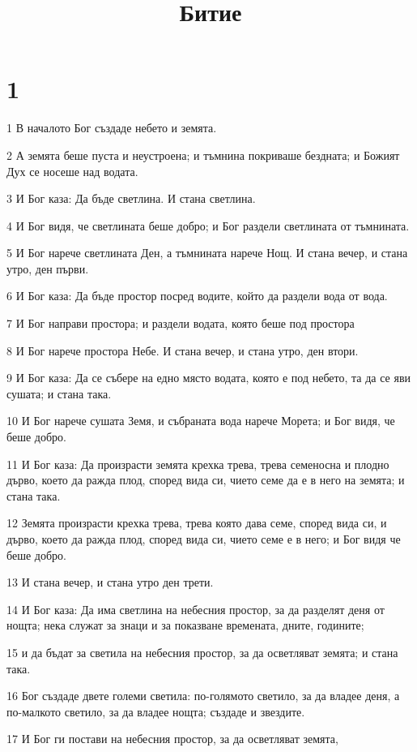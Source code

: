 

\title{Битие}


\chapter{1}

\par 1 В началото Бог създаде небето и земята.
\par 2 А земята беше пуста и неустроена; и тъмнина покриваше бездната; и Божият Дух се носеше над водата.
\par 3 И Бог каза: Да бъде светлина. И стана светлина.
\par 4 И Бог видя, че светлината беше добро; и Бог раздели светлината от тъмнината.
\par 5 И Бог нарече светлината Ден, а тъмнината нарече Нощ. И стана вечер, и стана утро, ден първи.
\par 6 И Бог каза: Да бъде простор посред водите, който да раздели вода от вода.
\par 7 И Бог направи простора; и раздели водата, която беше под простора
\par 8 И Бог нарече простора Небе. И стана вечер, и стана утро, ден втори.
\par 9 И Бог каза: Да се събере на едно място водата, която е под небето, та да се яви сушата; и стана така.
\par 10 И Бог нарече сушата Земя, и събраната вода нарече Морета; и Бог видя, че беше добро.
\par 11 И Бог каза: Да произрасти земята крехка трева, трева семеносна и плодно дърво, което да ражда плод, според вида си, чието семе да е в него на земята; и стана така.
\par 12 Земята произрасти крехка трева, трева която дава семе, според вида си, и дърво, което да ражда плод, според вида си, чието семе е в него; и Бог видя че беше добро.
\par 13 И стана вечер, и стана утро ден трети.
\par 14 И Бог каза: Да има светлина на небесния простор, за да разделят деня от нощта; нека служат за знаци и за показване времената, дните, годините;
\par 15 и да бъдат за светила на небесния простор, за да осветляват земята; и стана така.
\par 16 Бог създаде двете големи светила: по-голямото светило, за да владее деня, а по-малкото светило, за да владее нощта; създаде и звездите.
\par 17 И Бог ги постави на небесния простор, за да осветляват земята,
